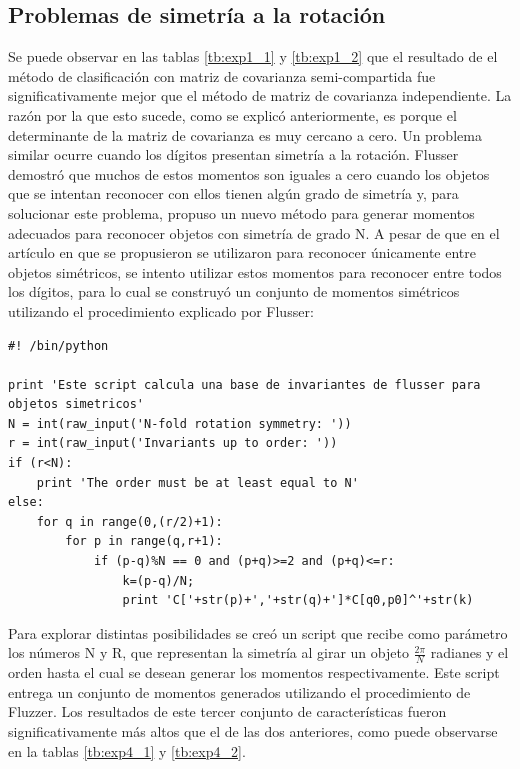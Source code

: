 \documentclass[a4paper, 11pt, oneside]{report}
\newenvironment{mylisting}
{\begin{list}{}{\setlength{\leftmargin}{1em}}\item\scriptsize\bfseries}
{\end{list}}
\begin{document}
\subsection{Problemas de simetría a la rotación}

Se puede observar en las tablas \ref{tb:exp1_1} y \ref{tb:exp1_2} que el resultado de el método de clasificación con matriz de covarianza semi-compartida fue significativamente mejor que el método de matriz de covarianza independiente. La razón por la que esto sucede, como se explicó anteriormente, es porque el determinante de la matriz de covarianza es muy cercano a cero. Un problema similar ocurre cuando los dígitos presentan simetría a la rotación. Flusser\cite{flusser06} demostró que muchos de estos momentos son iguales a cero cuando los objetos que se intentan reconocer con ellos tienen algún grado de simetría y, para solucionar este problema, propuso un nuevo método para generar momentos adecuados para reconocer objetos con simetría de grado N. A pesar de que en el artículo en que se propusieron se utilizaron para reconocer únicamente entre objetos simétricos, se intento utilizar estos momentos para reconocer entre todos los dígitos, para lo cual se construyó un conjunto de momentos simétricos utilizando el procedimiento explicado por Flusser:

\begin{mylisting}
\begin{verbatim}
#! /bin/python

print 'Este script calcula una base de invariantes de flusser para objetos simetricos'
N = int(raw_input('N-fold rotation symmetry: '))
r = int(raw_input('Invariants up to order: '))
if (r<N):
    print 'The order must be at least equal to N'
else:
    for q in range(0,(r/2)+1):
        for p in range(q,r+1):
            if (p-q)%N == 0 and (p+q)>=2 and (p+q)<=r:
                k=(p-q)/N;
                print 'C['+str(p)+','+str(q)+']*C[q0,p0]^'+str(k) 
\end{verbatim}
\end{mylisting}

Para explorar distintas posibilidades se creó un script que recibe como parámetro los números N y R, que representan la simetría al girar un objeto $\frac{2\pi}{N}$ radianes y el orden hasta el cual se desean generar los momentos respectivamente. Este script entrega un conjunto de momentos generados utilizando el procedimiento de Fluzzer. Los resultados de este tercer conjunto de características fueron significativamente más altos que el de las dos anteriores, como puede observarse en la tablas \ref{tb:exp4_1} y \ref{tb:exp4_2}.
\end{document}
